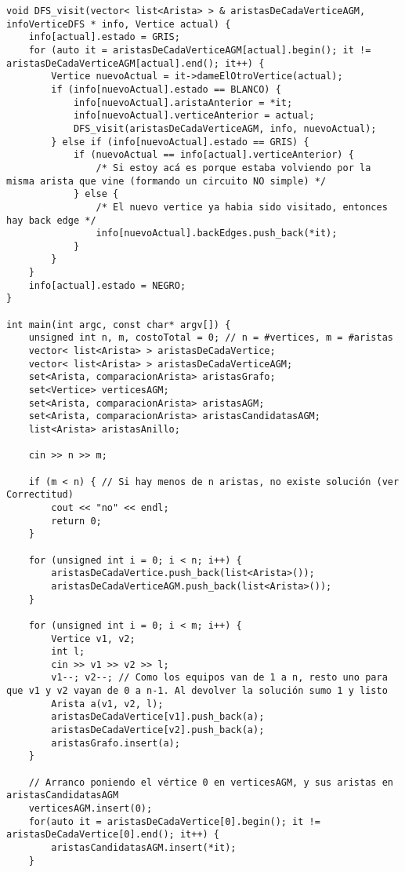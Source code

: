 \begin{lstlisting}[frame=single]
void DFS_visit(vector< list<Arista> > & aristasDeCadaVerticeAGM, infoVerticeDFS * info, Vertice actual) {
    info[actual].estado = GRIS;
    for (auto it = aristasDeCadaVerticeAGM[actual].begin(); it != aristasDeCadaVerticeAGM[actual].end(); it++) {
        Vertice nuevoActual = it->dameElOtroVertice(actual);
        if (info[nuevoActual].estado == BLANCO) {
            info[nuevoActual].aristaAnterior = *it;
            info[nuevoActual].verticeAnterior = actual;
            DFS_visit(aristasDeCadaVerticeAGM, info, nuevoActual);
        } else if (info[nuevoActual].estado == GRIS) {
            if (nuevoActual == info[actual].verticeAnterior) {
                /* Si estoy acá es porque estaba volviendo por la misma arista que vine (formando un circuito NO simple) */
            } else {
                /* El nuevo vertice ya habia sido visitado, entonces hay back edge */
                info[nuevoActual].backEdges.push_back(*it);
            }
        }
    }
    info[actual].estado = NEGRO;
}

int main(int argc, const char* argv[]) {
    unsigned int n, m, costoTotal = 0; // n = #vertices, m = #aristas
    vector< list<Arista> > aristasDeCadaVertice;
    vector< list<Arista> > aristasDeCadaVerticeAGM;
    set<Arista, comparacionArista> aristasGrafo;
    set<Vertice> verticesAGM;
    set<Arista, comparacionArista> aristasAGM;
    set<Arista, comparacionArista> aristasCandidatasAGM;
    list<Arista> aristasAnillo;
    
    cin >> n >> m;
    
    if (m < n) { // Si hay menos de n aristas, no existe solución (ver Correctitud)
        cout << "no" << endl;
        return 0;
    }
    
    for (unsigned int i = 0; i < n; i++) {
        aristasDeCadaVertice.push_back(list<Arista>());
        aristasDeCadaVerticeAGM.push_back(list<Arista>());
    }
    
    for (unsigned int i = 0; i < m; i++) {
        Vertice v1, v2;
        int l;
        cin >> v1 >> v2 >> l;
        v1--; v2--; // Como los equipos van de 1 a n, resto uno para que v1 y v2 vayan de 0 a n-1. Al devolver la solución sumo 1 y listo
        Arista a(v1, v2, l);
        aristasDeCadaVertice[v1].push_back(a);
        aristasDeCadaVertice[v2].push_back(a);
        aristasGrafo.insert(a);
    }
    
    // Arranco poniendo el vértice 0 en verticesAGM, y sus aristas en aristasCandidatasAGM
    verticesAGM.insert(0);
    for(auto it = aristasDeCadaVertice[0].begin(); it != aristasDeCadaVertice[0].end(); it++) {
        aristasCandidatasAGM.insert(*it);
    }
    

\end{lstlisting}
